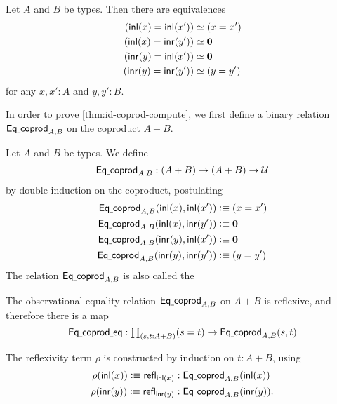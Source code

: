 \begin{thm}\label{thm:id-coprod-compute}
Let $A$ and $B$ be types. Then there are equivalences
\begin{align*}
({\mathsf{inl}}(x)={\mathsf{inl}}(x')) & \simeq (x = x')\\
({\mathsf{inl}}(x)={\mathsf{inr}}(y')) & \simeq \mathbf{0} \\
({\mathsf{inr}}(y)={\mathsf{inl}}(x')) & \simeq \mathbf{0} \\
({\mathsf{inr}}(y)={\mathsf{inr}}(y')) & \simeq (y=y')
\end{align*}
for any $x,x':A$ and $y,y':B$.
\end{thm}

In order to prove \cref{thm:id-coprod-compute}, we first define
a binary relation $\mathsf{Eq\underline{\ }{}coprod}_{A,B}$ on the coproduct $A+B$.

\begin{defn}
Let $A$ and $B$ be types. We define 
\begin{equation*}
\mathsf{Eq\underline{\ }{}coprod}_{A,B} : (A+B)\to (A+B)\to\mathcal{U}
\end{equation*}
by double induction on the coproduct, postulating
\begin{align*}
\mathsf{Eq\underline{\ }{}coprod}_{A,B}({\mathsf{inl}}(x),{\mathsf{inl}}(x')) & \vcentcolon\equiv (x=x') \\
\mathsf{Eq\underline{\ }{}coprod}_{A,B}({\mathsf{inl}}(x),{\mathsf{inr}}(y')) & \vcentcolon\equiv \mathbf{0} \\
\mathsf{Eq\underline{\ }{}coprod}_{A,B}({\mathsf{inr}}(y),{\mathsf{inl}}(x')) & \vcentcolon\equiv \mathbf{0} \\
\mathsf{Eq\underline{\ }{}coprod}_{A,B}({\mathsf{inr}}(y),{\mathsf{inr}}(y')) & \vcentcolon\equiv (y=y')
\end{align*}
The relation $\mathsf{Eq\underline{\ }{}coprod}_{A,B}$ is also called the 
\end{defn}

\begin{lem}
The observational equality relation $\mathsf{Eq\underline{\ }{}coprod}_{A,B}$ on $A+B$ is reflexive, and therefore there is a map
\begin{equation*}
\mathsf{Eq\usc{}coprod\usc{}eq}:\prd{s,t:A+B} (s=t)\to \mathsf{Eq\usc{}coprod}_{A,B}(s,t)
\end{equation*}
\end{lem}

\begin{constr}
The reflexivity term $\rho$ is constructed by induction on $t:A+B$, using
\begin{align*}
\rho({\mathsf{inl}}(x))\vcentcolon\equiv \mathsf{refl}_{{\mathsf{inl}}(x)}  & : \mathsf{Eq\underline{\ }{}coprod}_{A,B}({\mathsf{inl}}(x)) \\
\rho({\mathsf{inr}}(y))\vcentcolon\equiv \mathsf{refl}_{{\mathsf{inr}}(y)} & : \mathsf{Eq\underline{\ }{}coprod}_{A,B}({\mathsf{inr}}(y)).
\end{align*}
\end{constr}

